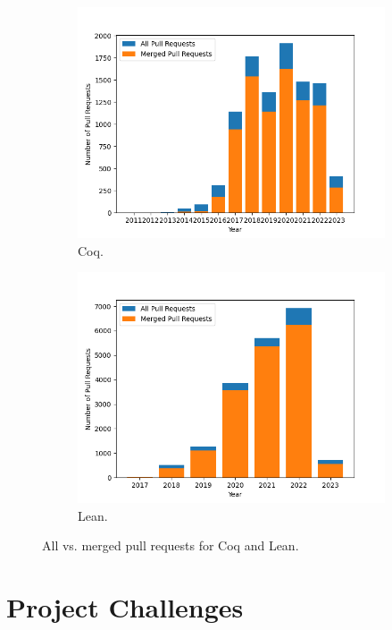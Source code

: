 \documentclass[sigconf,nonacm]{acmart}
\begin{document}
\begin{figure}
\begin{subfigure}[b]{0.8\columnwidth}
  \includegraphics[width=\linewidth]{coq_mergedvsall.png}
  \caption{Coq.}
  \label{fig:1}
\end{subfigure}
\hfill %
\begin{subfigure}[b]{0.8\columnwidth}
  \includegraphics[width=\linewidth]{lean_mergedvsall.png}
  \caption{Lean.}
  \label{fig:2}
\end{subfigure}
\caption{All vs. merged pull requests for Coq and Lean.}
\label{bars}
\end{figure}



\section{Project Challenges}
\end{document}
